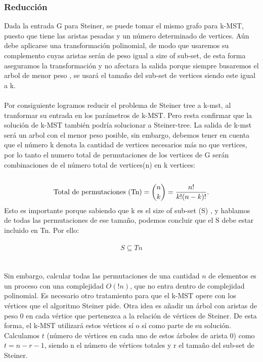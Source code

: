 \documentclass[spanish,12pt]{elsarticle}
\begin{document}
\subsubsection{Reducción}
\textnormal{Dada la entrada G para Steiner, se puede tomar el mismo grafo para k-MST, puesto que tiene las aristas pesadas y un número determinado de vertices. Aún debe aplicarse una transformación polinomial, de modo que usaremos su complemento cuyas aristas serán de peso igual a size of sub-set, de esta forma aseguramos la transformación y no afectara la salida porque siempre busaremos el arbol de menor peso , se usará el tamaño del sub-set de vertices siendo este igual a k.}\\\\
\textnormal{Por consiguiente logramos reducir el problema de Steiner tree a k-mst, al tranformar su entrada en los parámetros de k-MST. Pero resta confirmar que la solución de k-MST también podría solucionar a Steiner-tree. La salida de k-mst será un arbol con el menor peso posible, sin embargo, debemos tener en cuenta que el número k denota la cantidad de vertices necesarios más no que vertices, por lo tanto el numero total de permutaciones de los vertices de G serán combinaciones de el número total de vertices(n) en k vertices:}\\\\
\textit{
\[
\textnormal{Total~de~permutaciones (Tn)}= \binom{n}{k} = \frac{n!}{k!(n - k)! }.
\]
}
\textnormal{Esto es importante porque sabiendo que k es el size of sub-set (S) , y hablamos de todas las permutaciones de ese tamaño, podemos concluir que el S debe estar incluido en Tn. Por ello:  }\\\\
\textit{
\[
S \subseteq Tn
\]
}\\\\
Sin embargo, calcular todas las permutaciones de una cantidad $n$ de elementos es un proceso con una complejidad $O(!n)$, que no entra dentro de complejidad polinomial. Es necesario otro tratamiento para que el k-MST opere con los vértices que el algoritmo Steiner pide. Otra idea es añadir un árbol con aristas de peso 0 en cada vértice que pertenezca a la relación de vértices de Steiner. De esta forma, el k-MST utilizará estos vértices sí o sí como parte de su solución.
Calculamos $t$ (número de vértices en cada uno de estos árboles de arista 0) como $t = n-r-1$, siendo n el número de vértices totales y r el tamaño del sub-set de Steiner.\\\\ 
\end{document}
